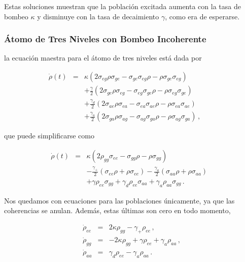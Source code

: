 \documentclass[12pt]{article}
\begin{document}
Estas soluciones muestran que la población excitada aumenta con la tasa de bombeo $\kappa$ y disminuye con la tasa de decaimiento $\gamma$, como era de esperarse.
\subsubsection{Átomo de Tres Niveles con Bombeo Incoherente}

la ecuación maestra para el átomo de tres niveles está dada por

\begin{eqnarray}
\dot{\rho}(t) &=&  \kappa (2\sigma_{eg} \rho \sigma_{ge} 
  	-\sigma_{ge} \sigma_{eg} \rho  -\rho \sigma_{ge} \sigma_{eg})     
  	\nonumber \\
&&+\frac{\gamma}{2} (2\sigma_{ge} \rho \sigma_{eg} 
  	-\sigma_{eg} \sigma_{ge} \rho  -\rho \sigma_{eg} \sigma_{ge})     
  	\nonumber \\
&& + \frac{\gamma_d}{2} (2\sigma_{ae} \rho \sigma_{ea} 
  	-\sigma_{ea} \sigma_{ae} \rho -\rho \sigma_{ea} \sigma_{ae}) 	
	\nonumber \\ 
&& +\frac{\gamma_a}{2} (2\sigma_{ga} \rho \sigma_{ag} 
  	-\sigma_{ag} \sigma_{ga} \rho  -\rho \sigma_{ag} \sigma_{ga}) \,, 
	\qquad
\end{eqnarray}

que puede simplificarse como

\begin{eqnarray}
\dot{\rho}(t) &=& \kappa ( 2 \rho_{gg} \sigma_{ee} -\sigma_{gg} \rho 
	-\rho \sigma_{gg} ) 	\nonumber \\
&& -\frac{\gamma_+}{2} (\sigma_{ee} \rho +\rho \sigma_{ee}) 
    -\frac{\gamma_a}{2} (\sigma_{aa} \rho +\rho \sigma_{aa}) 
        \nonumber \\
&& +\gamma \rho_{ee} \sigma_{gg}  +\gamma_d \rho_{ee} \sigma_{aa}    
    +\gamma_a \rho_{aa} \sigma_{gg}  \,.  \qquad \qquad  
    \label{masterEqInc}
\end{eqnarray}

Nos quedamos con ecuaciones para las poblaciones únicamente, ya que las coherencias se anulan. Además, estas últimas son cero en todo momento,

\begin{subequations}
\begin{eqnarray}
\dot{\rho}_{ee} &=& 2\kappa \rho_{gg} -\gamma_+ \rho_{ee} 	\,, \\ 
\dot{\rho}_{gg} &=& -2\kappa \rho_{gg} +\gamma \rho_{ee} 
	+\gamma_a \rho_{aa} 	\,, \\  
\dot{\rho}_{aa} &=& \gamma_d \rho_{ee} -\gamma_a \rho_{aa} 	\,.
\end{eqnarray}
\end{subequations}
\end{document}
